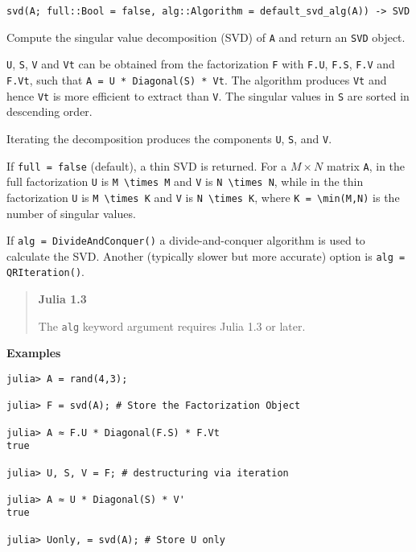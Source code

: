 \begin{adjustwidth}{2em}{0pt}


\begin{verbatim}
svd(A; full::Bool = false, alg::Algorithm = default_svd_alg(A)) -> SVD
\end{verbatim}

Compute the singular value decomposition (SVD) of \texttt{A} and return an \texttt{SVD} object.

\texttt{U}, \texttt{S}, \texttt{V} and \texttt{Vt} can be obtained from the factorization \texttt{F} with \texttt{F.U}, \texttt{F.S}, \texttt{F.V} and \texttt{F.Vt}, such that \texttt{A = U * Diagonal(S) * Vt}. The algorithm produces \texttt{Vt} and hence \texttt{Vt} is more efficient to extract than \texttt{V}. The singular values in \texttt{S} are sorted in descending order.

Iterating the decomposition produces the components \texttt{U}, \texttt{S}, and \texttt{V}.

If \texttt{full = false} (default), a {\textquotedbl}thin{\textquotedbl} SVD is returned. For a \(M \times N\) matrix \texttt{A}, in the full factorization \texttt{U} is \texttt{M {\textbackslash}times M} and \texttt{V} is \texttt{N {\textbackslash}times N}, while in the thin factorization \texttt{U} is \texttt{M {\textbackslash}times K} and \texttt{V} is \texttt{N {\textbackslash}times K}, where \texttt{K = {\textbackslash}min(M,N)} is the number of singular values.

If \texttt{alg = DivideAndConquer()} a divide-and-conquer algorithm is used to calculate the SVD. Another (typically slower but more accurate) option is \texttt{alg = QRIteration()}.

\begin{quote}
\textbf{Julia 1.3}

The \texttt{alg} keyword argument requires Julia 1.3 or later.

\end{quote}
\textbf{Examples}


\begin{verbatim}
julia> A = rand(4,3);

julia> F = svd(A); # Store the Factorization Object

julia> A ≈ F.U * Diagonal(F.S) * F.Vt
true

julia> U, S, V = F; # destructuring via iteration

julia> A ≈ U * Diagonal(S) * V'
true

julia> Uonly, = svd(A); # Store U only


\end{verbatim}
\end{adjustwidth}
